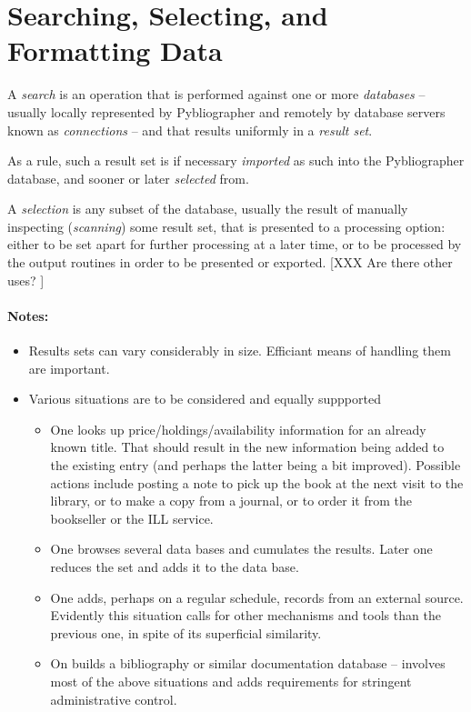 
\section{Searching, Selecting, and Formatting Data}
\label{sec:processing}


A \textit{search} is an operation that is performed against one or
more \textit{databases} -- usually locally represented by
Pybliographer and remotely by database servers known as
\textit{connections} -- and that results uniformly in a \textit{result
  set}.

As a rule, such a result set is if necessary \textit{imported} as such
into the Pybliographer database, and sooner or later \textit{selected}
from.

A \textit{selection} is any subset of the database, usually the result
of manually inspecting (\textit{scanning}) some result set, that is
presented to a processing option: either to be set apart for further
processing at a later time, or to be processed by the output routines
in order to be presented or exported.
[XXX Are there other uses? ]



\paragraph{Notes:}

\begin{itemize}
\item Results sets can vary considerably in size. Efficiant means of
  handling them are important.
\item Various situations are to be considered and equally suppported
  \begin{itemize}
  \item One looks up price/holdings/availability information for an
    already known title.  That should result in the new information
    being added to the existing entry (and perhaps the latter being a
    bit improved). Possible actions include posting a note to pick up
    the book at the next visit to the library, or to make a copy from a
    journal, or to order it from the bookseller or the ILL service.
  \item One browses several data bases and cumulates the
    results. Later one reduces the set and adds it to the data base.
  \item One adds, perhaps on a regular schedule, records from an
    external source. Evidently this situation calls for other
    mechanisms and tools than the previous one, in spite of its
    superficial similarity. 
  \item On builds a bibliography or similar documentation database --
    involves most of the above situations and adds requirements for
    stringent administrative control. 
  \end{itemize}
\end{itemize}



